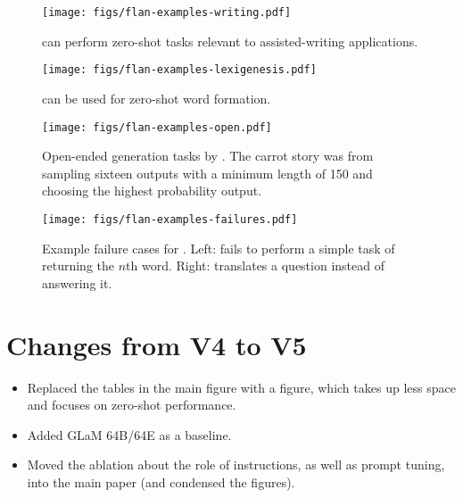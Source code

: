 \begin{figure}[h]
    \centering
    \vspace{2mm}
    \texttt{[image: figs/flan-examples-writing.pdf]}
    \vspace{-4mm}
    \caption{\flan{} can perform zero-shot tasks relevant to assisted-writing applications. \samplingexplanation{}}
    \label{fig:examples-writing}
\end{figure}

\begin{figure}[h]
    \centering
    \vspace{2mm}
    \texttt{[image: figs/flan-examples-lexigenesis.pdf]}
    \vspace{-3mm}
    \caption{\flan{} can be used for zero-shot word formation. \samplingexplanation{}}
    \label{fig:examples-lexigenesis}
\end{figure}

\begin{figure}[h]
    \centering
    \vspace{2mm}
    \texttt{[image: figs/flan-examples-open.pdf]}
    \vspace{-3mm}
    \caption{Open-ended generation tasks by \flan{}. The carrot story was from sampling sixteen outputs with a minimum length of 150 and choosing the highest probability output.}
    \label{fig:examples-open}
\end{figure}

\begin{figure}[h]
    \centering
    \vspace{2mm}
    \texttt{[image: figs/flan-examples-failures.pdf]}
    \vspace{-3mm}
    \caption{Example failure cases for \flan{}. Left: \flan{} fails to perform a simple task of returning the $n$th word. Right: \flan{} translates a question instead of answering it. \samplingexplanation{}}
    \label{fig:examples-failures}
\end{figure}

\clearpage
\section*{Changes from V4 to V5}
\begin{itemize}
    \item Replaced the tables in the main figure with a figure, which takes up less space and focuses on zero-shot performance. \item Added GLaM 64B/64E as a baseline.
    \item Moved the ablation about the role of instructions, as well as prompt tuning, into the main paper (and condensed the figures).
\end{itemize}

